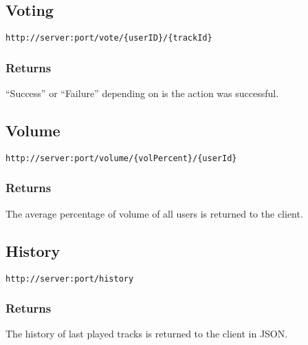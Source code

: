 \subsection{Voting}

\begin{lstlisting}[label={lst:endpoint_vote}, caption={Text surrounded by curly brackets are parameters.}]
http://server:port/vote/{userID}/{trackId}
\end{lstlisting}

\subsubsection{Returns}
\enquote{Success} or \enquote{Failure} depending on is the action was successful.

\subsection{Volume}

\begin{lstlisting}[label={lst:endpoint_volume}, caption={Text surrounded by curly brackets are parameters.}]
http://server:port/volume/{volPercent}/{userId}
\end{lstlisting}

\subsubsection{Returns}
The average percentage of volume of all users is returned to the client.

\subsection{History}

\begin{lstlisting}[label={lst:endpoint_history}, caption={Endpoint for
  history.}]
http://server:port/history
\end{lstlisting}

\subsubsection{Returns}
The history of last played tracks is returned to the client in JSON.


